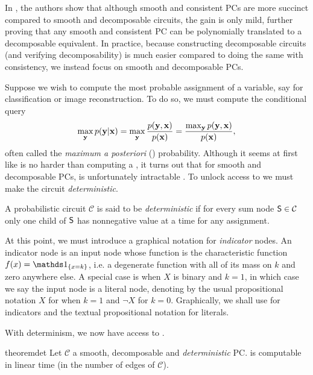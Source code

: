In \citet{peharz15}, the authors show that although smooth and consistent PCs are more succinct
\citep{darwiche02} compared to smooth and decomposable circuits, the gain is only mild, further
proving that any smooth and consistent PC can be polynomially translated to a decomposable
equivalent. In practice, because constructing decomposable circuits (and verifying decomposability)
is much easier compared to doing the same with consistency, we instead focus on smooth and
decomposable PCs.

Suppose we wish to compute the most probable assignment of a variable, say for classification or
image reconstruction. To do so, we must compute the conditional query
\begin{equation}
  \max_{\mathbf{y}}p(\mathbf{y}|\mathbf{x})=\max_{\mathbf{y}}\frac{p(\mathbf{y},\mathbf{x})}{p(\mathbf{x})}=
  \frac{\max_{\mathbf{y}}p(\mathbf{y},\mathbf{x})}{p(\mathbf{x})},
  \label{eq:map}
\end{equation}
often called the \emph{maximum a posteriori} (\map) probability. Although it seems at first like
\map{} is no harder than computing a \con{}, it turns out that for smooth and decomposable PCs,
\map{} is unfortunately intractable \citep{conaty17,mei18}. To unlock access to \map{} we must make
the circuit \emph{deterministic}.

\begin{definition}[Determinism]
  A probabilistic circuit $\mathcal{C}$ is said to be \emph{deterministic} if for every sum node
  $\operatorname{\textsf{S}}\in\mathcal{C}$ only one child of $\operatorname{\textsf{S}}$ has nonnegative value at a time for any assignment.
\end{definition}

At this point, we must introduce a graphical notation for \emph{indicator} nodes. An indicator node
is an input node whose function is the characteristic function $f(x)=\ind_{\{x=k\}}$, i.e. a
degenerate function with all of its mass on $k$ and zero anywhere else. A special case is when $X$
is binary and $k=1$, in which case we say the input node is a literal node, denoting by the usual
propositional notation $X$ for when $k=1$ and $\neg X$ for $k=0$. Graphically, we shall use
\inode{\newLeafNode} for indicators and the textual propositional notation for literals.

With determinism, we now have access to \map{}.

\begin{restatable}{theorem}{det}
  \label{thm:det}
  Let $\mathcal{C}$ a smooth, decomposable and \emph{deterministic} PC. \map{} is computable in
  linear time (in the number of edges of $\mathcal{C}$).
\end{restatable}

